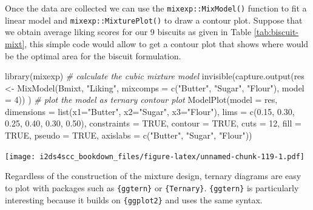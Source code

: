 \documentclass[
]{book}
\newenvironment{Shaded}{\begin{snugshade}}{\end{snugshade}}
\newcommand{\AttributeTok}[1]{\textcolor[rgb]{0.77,0.63,0.00}{#1}}
\newcommand{\CommentTok}[1]{\textcolor[rgb]{0.56,0.35,0.01}{\textit{#1}}}
\newcommand{\ConstantTok}[1]{\textcolor[rgb]{0.00,0.00,0.00}{#1}}
\newcommand{\DecValTok}[1]{\textcolor[rgb]{0.00,0.00,0.81}{#1}}
\newcommand{\FloatTok}[1]{\textcolor[rgb]{0.00,0.00,0.81}{#1}}
\newcommand{\FunctionTok}[1]{\textcolor[rgb]{0.00,0.00,0.00}{#1}}
\newcommand{\NormalTok}[1]{#1}
\newcommand{\OtherTok}[1]{\textcolor[rgb]{0.56,0.35,0.01}{#1}}
\newcommand{\StringTok}[1]{\textcolor[rgb]{0.31,0.60,0.02}{#1}}
\begin{document}
Once the data are collected we can use the \texttt{mixexp::MixModel()} function to fit a linear model and \texttt{mixexp::MixturePlot()} to draw a contour plot. Suppose that we obtain average liking scores for our 9 biscuits as given in Table \ref{tab:biscuit-mixt}, this simple code would allow to get a contour plot that shows where would be the optimal area for the biscuit formulation.

\begin{Shaded}
\begin{Highlighting}[]
\FunctionTok{library}\NormalTok{(mixexp)}
\CommentTok{\# calculate the cubic mixture model }
\FunctionTok{invisible}\NormalTok{(}\FunctionTok{capture.output}\NormalTok{(res }\OtherTok{\textless{}{-}} \FunctionTok{MixModel}\NormalTok{(Bmixt, }\StringTok{"Liking"}\NormalTok{,}
                                        \AttributeTok{mixcomps =} \FunctionTok{c}\NormalTok{(}\StringTok{"Butter"}\NormalTok{, }\StringTok{"Sugar"}\NormalTok{, }\StringTok{"Flour"}\NormalTok{), }\AttributeTok{model =} \DecValTok{4}\NormalTok{)) )}
\CommentTok{\# plot the model as ternary contour plot}
\FunctionTok{ModelPlot}\NormalTok{(}\AttributeTok{model =}\NormalTok{ res,}
          \AttributeTok{dimensions =} \FunctionTok{list}\NormalTok{(}\AttributeTok{x1=}\StringTok{"Butter"}\NormalTok{, }\AttributeTok{x2=}\StringTok{"Sugar"}\NormalTok{, }\AttributeTok{x3=}\StringTok{"Flour"}\NormalTok{),}
          \AttributeTok{lims =} \FunctionTok{c}\NormalTok{(}\FloatTok{0.15}\NormalTok{, }\FloatTok{0.30}\NormalTok{, }\FloatTok{0.25}\NormalTok{, }\FloatTok{0.40}\NormalTok{, }\FloatTok{0.30}\NormalTok{, }\FloatTok{0.50}\NormalTok{), }\AttributeTok{constraints =} \ConstantTok{TRUE}\NormalTok{,}
          \AttributeTok{contour =} \ConstantTok{TRUE}\NormalTok{, }\AttributeTok{cuts =} \DecValTok{12}\NormalTok{, }\AttributeTok{fill =} \ConstantTok{TRUE}\NormalTok{, }\AttributeTok{pseudo =} \ConstantTok{TRUE}\NormalTok{,}
          \AttributeTok{axislabs =} \FunctionTok{c}\NormalTok{(}\StringTok{"Butter"}\NormalTok{, }\StringTok{"Sugar"}\NormalTok{, }\StringTok{"Flour"}\NormalTok{))}
\end{Highlighting}
\end{Shaded}

\texttt{[image: i2ds4scc\_bookdown\_files/figure-latex/unnamed-chunk-119-1.pdf]}

Regardless of the construction of the mixture design, ternary diagrams are easy to plot with packages such as \texttt{\{ggtern\}} or \texttt{\{Ternary\}}. \texttt{\{ggtern\}} is particularly interesting because it builds on \texttt{\{ggplot2\}} and uses the same syntax.
\end{document}
